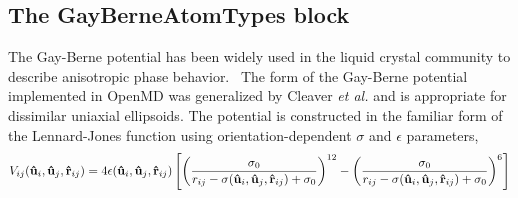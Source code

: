 \documentclass[]{book}
\begin{document}

\subsection{\label{section:ffGB}The GayBerneAtomTypes block}

The Gay-Berne potential has been widely used in the liquid crystal
community to describe anisotropic phase
behavior.~\cite{Gay:1981yu,Berne:1972pb,Kushick:1976xy,Luckhurst:1990fy,Cleaver:1996rt}
The form of the Gay-Berne potential implemented in OpenMD was
generalized by Cleaver {\it et al.} and is appropriate for dissimilar
uniaxial ellipsoids.\cite{Cleaver:1996rt} The potential is constructed
in the familiar form of the Lennard-Jones function using
orientation-dependent $\sigma$ and $\epsilon$ parameters,
\begin{equation*}
V_{ij}({{\bf \hat u}_i}, {{\bf \hat u}_j}, {{\bf \hat
r}_{ij}}) = 4\epsilon ({{\bf \hat u}_i}, {{\bf \hat u}_j},
{{\bf \hat r}_{ij}})\left[\left(\frac{\sigma_0}{r_{ij}-\sigma({{\bf \hat u
}_i},
{{\bf \hat u}_j}, {{\bf \hat r}_{ij}})+\sigma_0}\right)^{12}
-\left(\frac{\sigma_0}{r_{ij}-\sigma({{\bf \hat u}_i}, {{\bf \hat u}_j},
{{\bf \hat r}_{ij}})+\sigma_0}\right)^6\right]
\label{eq:gb}
\end{equation*}
\end{document}
